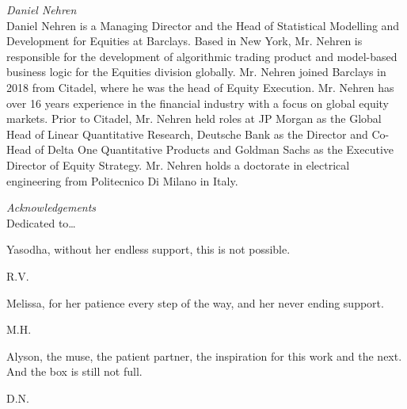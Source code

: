 {\noindent\large\itshape Daniel Nehren} \\[0.2cm]
\noindent Daniel Nehren is a Managing Director and the Head of Statistical Modelling and Development for Equities at Barclays. Based in New York, Mr. Nehren is responsible for the development of algorithmic trading product and model-based business logic for the Equities division globally. Mr. Nehren joined Barclays in 2018 from Citadel, where he was the head of Equity Execution. Mr. Nehren has over 16 years experience in the financial industry with a focus on global equity markets. Prior to Citadel, Mr. Nehren held roles at JP Morgan as the Global Head of Linear Quantitative Research, Deutsche Bank as the Director and Co-Head of Delta One Quantitative Products and Goldman Sachs as the Executive Director of Equity Strategy. Mr. Nehren holds a doctorate in electrical engineering from Politecnico Di Milano in Italy.



\newpage



{\itshape \large Acknowledgements} \\


Dedicated to\dots \\


\begin{minipage}[t]{0.8\textwidth}
	\raggedright
		Yasodha, without her endless support, this is not possible. \par
  	\raggedleft
  	R.V.
\end{minipage} \vspace{1cm}


\begin{minipage}[t]{0.8\textwidth}
	\raggedright
		Melissa, for her patience every step of the way, and her never ending support. \par
  	\raggedleft
  	M.H.
\end{minipage} \vspace{1cm}


\begin{minipage}[t]{0.8\textwidth}
	\raggedright
		Alyson, the muse, the patient partner, the inspiration for this work and the next. And the box is still not full. \par
  	\raggedleft
  	D.N.
\end{minipage} 